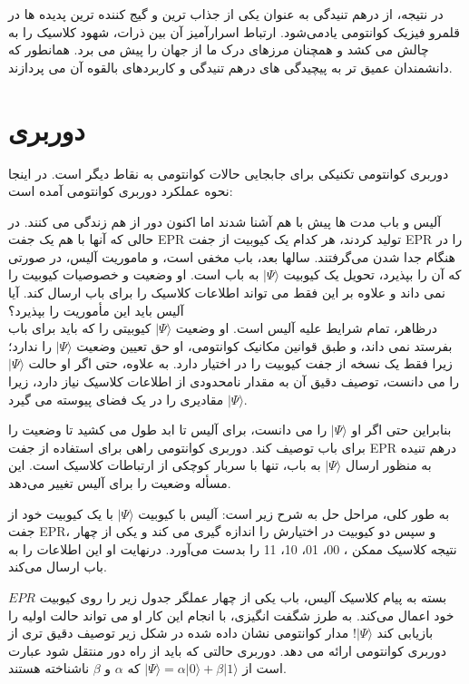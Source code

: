 \documentclass{book}
\begin{document}
در نتیجه، از درهم تنیدگی به عنوان یکی از جذاب ترین و گیج کننده ترین پدیده ها در قلمرو فیزیک کوانتومی یاد‌می‌شود. ارتباط اسرارآمیز آن بین ذرات، شهود کلاسیک را به چالش می کشد و همچنان مرزهای درک ما از جهان را پیش می برد. همانطور که دانشمندان عمیق تر به پیچیدگی های درهم تنیدگی و کاربردهای بالقوه آن می پردازند.

\section{دوربری}
دوربری کوانتومی تکنیکی برای جابجایی حالات کوانتومی به نقاط دیگر است. در اینجا نحوه عملکرد دوربری کوانتومی آمده است:

 آلیس و باب مدت ها پیش با هم آشنا شدند اما اکنون دور از هم زندگی می کنند. در حالی که آنها با هم یک جفت EPR تولید کردند، هر کدام یک کیوبیت از جفت EPR را در هنگام جدا شدن می‌گرفتند. سالها بعد، باب مخفی است، و ماموریت آلیس، در صورتی که آن را بپذیرد، تحویل یک کیوبیت $\vert \Psi \rangle$ به باب است. او وضعیت  و خصوصیات کیوبیت را نمی داند و علاوه بر این فقط می تواند اطلاعات کلاسیک را برای باب ارسال کند. آیا آلیس باید این مأموریت را بپذیرد؟\\


درظاهر، تمام شرایط علیه آلیس است. او وضعیت $\vert \Psi \rangle$ کیوبیتی را که باید برای باب بفرستد نمی داند، و طبق قوانین مکانیک کوانتومی، او حق تعیین وضعیت $\vert \Psi \rangle$ را ندارد؛‌زیرا فقط یک نسخه از جفت کیوبیت را در اختیار دارد. به علاوه، حتی اگر او حالت $\vert \Psi \rangle$ را می دانست، توصیف دقیق آن به مقدار نامحدودی از اطلاعات کلاسیک نیاز دارد، زیرا $\vert \Psi \rangle$ مقادیری را در یک فضای پیوسته می گیرد.

بنابراین حتی اگر او $\vert \Psi \rangle$ را می دانست، برای آلیس تا ابد طول می کشید تا وضعیت را برای باب توصیف کند. دوربری کوانتومی راهی برای استفاده از جفت EPR درهم تنیده به منظور ارسال $\vert \Psi \rangle$ به باب، تنها با سربار کوچکی از ارتباطات کلاسیک است. این مسأله وضعیت را برای آلیس تغییر می‌دهد.

به طور کلی، مراحل حل به شرح زیر است: آلیس با کیوبیت $\vert \Psi \rangle$ با یک کیوبیت خود از جفت EPR، و سپس دو کیوبیت در اختیارش را اندازه گیری می کند و یکی از چهار نتیجه کلاسیک ممکن
، 00، 01، 10، 11 را بدست می‌آورد. درنهایت او این اطلاعات را به باب ارسال می‌کند.


 بسته به پیام کلاسیک آلیس، باب یکی از چهار عملگر جدول زیر را روی کیوبیت $EPR$ خود اعمال می‌کند.
 به طرز شگفت انگیزی، با انجام این کار او می تواند حالت اولیه را بازیابی کند $\vert \Psi \rangle$! مدار کوانتومی نشان داده شده در شکل زیر توصیف دقیق تری از دوربری کوانتومی ارائه می دهد.
دوربری حالتی که باید از راه دور منتقل شود عبارت است از $\vert \Psi \rangle = \alpha \vert 0 \rangle + \beta \vert 1 \rangle$ که $\alpha$ و $\beta$ ناشناخته هستند.
\end{document}
